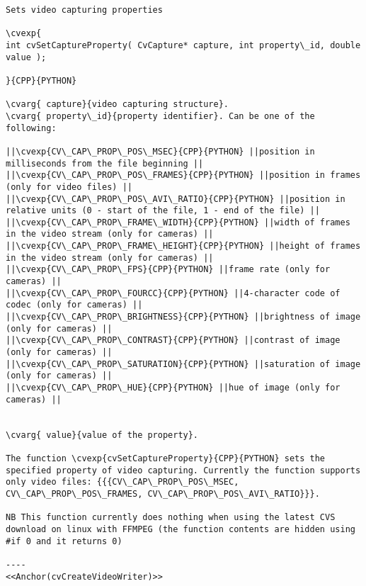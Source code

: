 \begin{verbatim}
Sets video capturing properties

\cvexp{
int cvSetCaptureProperty( CvCapture* capture, int property\_id, double value );

}{CPP}{PYTHON}

\cvarg{ capture}{video capturing structure}.
\cvarg{ property\_id}{property identifier}. Can be one of the following:

||\cvexp{CV\_CAP\_PROP\_POS\_MSEC}{CPP}{PYTHON} ||position in milliseconds from the file beginning ||
||\cvexp{CV\_CAP\_PROP\_POS\_FRAMES}{CPP}{PYTHON} ||position in frames (only for video files) ||
||\cvexp{CV\_CAP\_PROP\_POS\_AVI\_RATIO}{CPP}{PYTHON} ||position in relative units (0 - start of the file, 1 - end of the file) ||
||\cvexp{CV\_CAP\_PROP\_FRAME\_WIDTH}{CPP}{PYTHON} ||width of frames in the video stream (only for cameras) ||
||\cvexp{CV\_CAP\_PROP\_FRAME\_HEIGHT}{CPP}{PYTHON} ||height of frames in the video stream (only for cameras) ||
||\cvexp{CV\_CAP\_PROP\_FPS}{CPP}{PYTHON} ||frame rate (only for cameras) ||
||\cvexp{CV\_CAP\_PROP\_FOURCC}{CPP}{PYTHON} ||4-character code of codec (only for cameras) ||
||\cvexp{CV\_CAP\_PROP\_BRIGHTNESS}{CPP}{PYTHON} ||brightness of image (only for cameras) ||
||\cvexp{CV\_CAP\_PROP\_CONTRAST}{CPP}{PYTHON} ||contrast of image (only for cameras) ||
||\cvexp{CV\_CAP\_PROP\_SATURATION}{CPP}{PYTHON} ||saturation of image (only for cameras) ||
||\cvexp{CV\_CAP\_PROP\_HUE}{CPP}{PYTHON} ||hue of image (only for cameras) ||


\cvarg{ value}{value of the property}.

The function \cvexp{cvSetCaptureProperty}{CPP}{PYTHON} sets the specified property of video capturing. Currently the function supports only video files: {{{CV\_CAP\_PROP\_POS\_MSEC, CV\_CAP\_PROP\_POS\_FRAMES, CV\_CAP\_PROP\_POS\_AVI\_RATIO}}}.

NB This function currently does nothing when using the latest CVS download on linux with FFMPEG (the function contents are hidden using #if 0 and it returns 0)

----
<<Anchor(cvCreateVideoWriter)>>
\end{verbatim}
